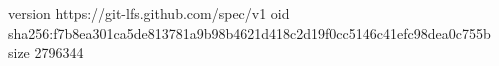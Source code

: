 version https://git-lfs.github.com/spec/v1
oid sha256:f7b8ea301ca5de813781a9b98b4621d418c2d19f0cc5146c41efc98dea0c755b
size 2796344
